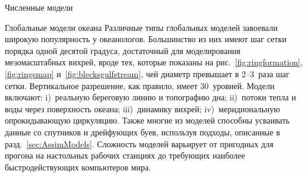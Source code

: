 \begin{chapter}{Численные модели}
\begin{section}{Глобальные модели океана}
Различные типы глобальных моделей завоевали широкую популярность у океанологов.
Большинство из них имеют шаг сетки порядка одной десятой градуса, достаточный
для моделирования мезомасштабных вихрей, вроде
тех, которые показаны на рис.~\ref{fig:ringformation}, \ref{fig:ringsmap}
и~\ref{fig:blecksgulfstream}, чей диаметр превышает в 2--3~раза шаг сетки.
Вертикальное разрешение, как правило, имеет 30~уровней. Модели включают:
i)~реальную береговую линию и топографию дна; 
ii)~потоки тепла и воды через поверхность океана; 
iii)~динамику вихрей; 
iv)~меридиональную опрокидывающую 
циркуляцию.
Также многие из моделей способны усваивать данные со спутников и дрейфующих
буев, используя подходы, описанные в разд.~\ref{sec:AssimModels}. 
Сложность моделей варьирует от пригодных для прогона на настольных рабочих 
станциях до требующих наиболее быстродействующих компьютеров мира.
%



\end{section}
\end{chapter}
